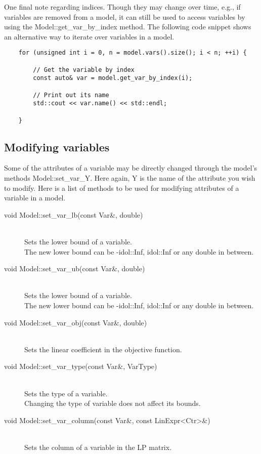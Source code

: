 One final note regarding indices. Though they may change over time, e.g., if
variables are removed from a model, it can still be used to access variables
by using the \textsf{Model::get\_var\_by\_index} method. The following code
snippet shows an alternative way to iterate over variables in a model. 

\begin{lstlisting}
    for (unsigned int i = 0, n = model.vars().size(); i < n; ++i) {
        
        // Get the variable by index
        const auto& var = model.get_var_by_index(i);
        
        // Print out its name
        std::cout << var.name() << std::endl;

    }
\end{lstlisting}

\subsection{Modifying variables}

Some of the attributes of a variable may be directly changed through the
model's methods \textsf{Model::set\_var\_Y}. Here again, \textsf{Y} is the
name of the attribute you wish to modify. Here is a list of methods to be used
for modifying attributes of a variable in a model.
%
\begin{description}
    \item[\textsf{void Model::set\_var\_lb(const Var\&, double)}]\hphantom{.}\\ 
    Sets the lower bound of a variable. \\
    The new lower bound can be \textsf{-idol::Inf}, \textsf{idol::Inf} or any
    double in between. 
    \item[\textsf{void Model::set\_var\_ub(const Var\&, double)}]\hphantom{.}\\ 
    Sets the lower bound of a variable. \\
    The new lower bound can be \textsf{-idol::Inf}, \textsf{idol::Inf} or any
    double in between. 
    \item[\textsf{void Model::set\_var\_obj(const Var\&, double)}]\hphantom{.}\\ 
    Sets the linear coefficient in the objective function. 
    \item[\textsf{void Model::set\_var\_type(const Var\&, VarType)}]\hphantom{.}\\ 
    Sets the type of a variable. \\
    Changing the type of variable does not affect its bounds. 
    \item[\textsf{void Model::set\_var\_column(const Var\&, const LinExpr<Ctr>\&)}]\hphantom{.}\\ 
    Sets the column of a variable in the LP matrix. 
\end{description}

